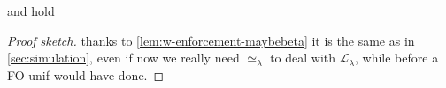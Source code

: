 \documentclass[sigconf,natbib=false,review]{acmart}
\newcommand{\UnifRel}{\ensuremath{\simeq}}
\newcommand{\Uo}{\ensuremath{\UnifRel_o}\xspace}
\newcommand{\Ue}{\ensuremath{\UnifRel_\lambda}\xspace}
\newcommand{\llambda}{\ensuremath{\mathcal{L}_\lambda}\xspace}
\begin{document}
\begin{theorem}  and
 hold
\end{theorem}
\begin{proof}[Proof sketch] thanks to \cref{lem:w-enforcement-maybebeta}
  it is the same as in \cref{sec:simulation}, even if now
  we really need \Ue{} to deal with \llambda, while before a FO unif
  would have done.
\end{proof}







\end{document}
